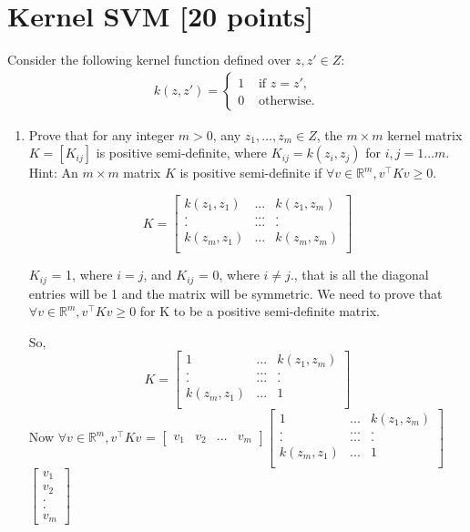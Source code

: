 \documentclass[a4paper]{article}
\theoremstyle{definition}
\def\v{\mathbf v}
\def\R{\mathbb R}
\newenvironment{soln}{
    \leavevmode\color{blue}\ignorespaces
}{}
\begin{document}
\section{Kernel SVM [20 points]}
Consider the following kernel function defined over $z,z'\in Z$:
\begin{align*}
k(z,z') =
\begin{cases}
1 & \text{~if~} z=z', \\
0 & \text{~otherwise.}
\end{cases}
\end{align*}
\begin{enumerate}
\item Prove that for any integer $m>0$, any $z_1, \ldots, z_m \in Z$, the $m \times m$ kernel matrix $K=[K_{ij}]$ is positive semi-definite, where $K_{ij}=k(z_i, z_j)$ for $i,j=1\ldots m$.
Hint: An $m\times m$ matrix $K$ is positive semi-definite if $\forall v \in \R^m, v^\top K v \ge 0$.

\begin{soln}

$$
K= \begin{bmatrix}
k(z_1,z_1)&...&k(z_1,z_m)\\
.&...&.\\
.&...&.\\
k(z_m,z_1)&...&k(z_m,z_m)\\
\end{bmatrix}
$$

$K_{ij}$ = 1, where $i=j$, and $K_{ij}$ = 0,  where $i \neq j.$, that is all the diagonal entries will be 1 and the matrix will be symmetric.
We need to prove that $\forall v \in \R^m, v^\top K v \ge 0$ for K to be a positive semi-definite matrix. 

So,
$$
K = \begin{bmatrix}
1&...&k(z_1,z_m)\\
.&...&.\\
.&...&.\\
k(z_m,z_1)&...&1\\
\end{bmatrix}
$$
Now $\forall v \in \R^m, v^\top K v $ = $ \begin{bmatrix}v_1&v_2 &... &v_m \end{bmatrix}$$\begin{bmatrix}
1&...&k(z_1,z_m)\\
.&...&.\\
.&...&.\\
k(z_m,z_1)&...&1\\
\end{bmatrix}$
$ \begin{bmatrix}v_1\\v_2 \\ .\\.\\ v_m \end{bmatrix}$


\end{soln}
\end{enumerate}
\end{document}
